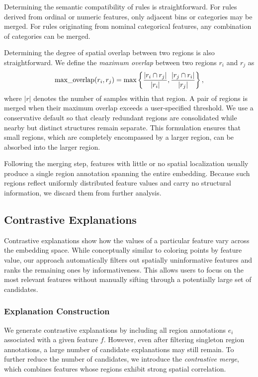 \documentclass[lettersize,journal]{IEEEtran}
\begin{document}
Determining the semantic compatibility of rules is straightforward. For rules derived from ordinal or numeric features, only adjacent bins or categories may be merged. For rules originating from nominal categorical features, any combination of categories can be merged.

Determining the degree of spatial overlap between two regions is also straightforward.
We define the \textit{maximum overlap} between two regions $r_i$ and $r_j$ as
\begin{equation}
\text{max\_overlap}(r_i, r_j) = \max \left \{ \frac{|r_i \cap r_j|}{|r_i|}, \frac{|r_j \cap r_i|}{|r_j|} \right \}, \notag
\end{equation}
where $|r|$ denotes the number of samples within that region.
A pair of regions is merged when their maximum overlap exceeds a user-specified threshold. We use a conservative default so that clearly redundant regions are consolidated while nearby but distinct structures remain separate.
This formulation ensures that small regions, which are completely encompassed by a larger region, can be absorbed into the larger region.

Following the merging step, features with little or no spatial localization usually produce a single region annotation spanning the entire embedding.
Because such regions reflect uniformly distributed feature values and carry no structural information, we discard them from further analysis.

\subsection{Contrastive Explanations}
\label{sec:contrastive}

Contrastive explanations show how the values of a particular feature vary across the embedding space. While conceptually similar to coloring points by feature value, our approach automatically filters out spatially uninformative features and ranks the remaining ones by informativeness. This allows users to focus on the most relevant features without manually sifting through a potentially large set of candidates.

\subsubsection{Explanation Construction}

We generate contrastive explanations by including all region annotations $e_i$ associated with a given feature $f$.
However, even after filtering singleton region annotations, a large number of candidate explanations may still remain.
To further reduce the number of candidates, we introduce the \textit{contrastive merge}, which combines features whose regions exhibit strong spatial correlation.
\end{document}
